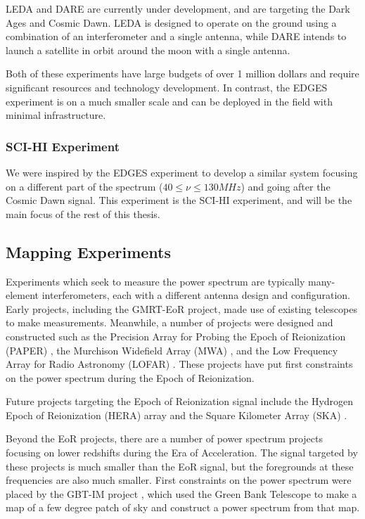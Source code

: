 LEDA \cite{leda}\cite{bernardi_2014} and DARE \cite{burns_2011} are currently under development, and are targeting the Dark Ages and Cosmic Dawn. LEDA is designed to operate on the ground using a combination of an interferometer and a single antenna, while DARE intends to launch a satellite in orbit around the moon with a single antenna. 

Both of these experiments have large budgets of over 1 million dollars and require significant resources and technology development. In contrast, the EDGES experiment is on a much smaller scale and can be deployed in the field with minimal infrastructure. 

\subsubsection{SCI-HI Experiment}
We were inspired by the EDGES experiment to develop a similar system focusing on a different part of the \cm spectrum ($40 \leq \nu \leq 130 MHz$) and going after the Cosmic Dawn signal. This experiment is the SCI-HI experiment, and will be the main focus of the rest of this thesis.  

\subsection{Mapping Experiments}
Experiments which seek to measure the \cm power spectrum are typically many-element interferometers, each with a different antenna design and configuration. Early projects, including the GMRT-EoR \cite{paciga_2013} project, made use of existing telescopes to make measurements. Meanwhile, a number of projects were designed and constructed such as the Precision Array for Probing the Epoch of Reionization (PAPER) \cite{pober_2013}\cite{jacobs_2014}, the Murchison Widefield Array (MWA) \cite{bernardi_2013}\cite{tingay_2012}, and the Low Frequency Array for Radio Astronomy (LOFAR) \cite{jelic_2014}\cite{lofar}. These projects have put first constraints on the power spectrum during the Epoch of Reionization. 

Future projects targeting the Epoch of Reionization signal include the Hydrogen Epoch of Reionization (HERA) \cite{hera}\cite{bernardi_2014} array and the Square Kilometer Array (SKA) \cite{ska}.

Beyond the EoR projects, there are a number of power spectrum projects focusing on lower redshifts during the Era of Acceleration. The \cm signal targeted by these projects is much smaller than the EoR signal, but the foregrounds at these frequencies are also much smaller. First constraints on the power spectrum were placed by the GBT-IM project \cite{masui_2012}\cite{switzer_2013}, which used the Green Bank Telescope to make a map of a few degree patch of sky and construct a power spectrum from that map. 

